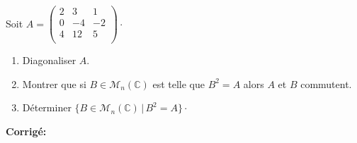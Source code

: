 \documentclass[a4paper,twoside,french,10pt]{VcCours}
\newcommand{\corr}{\textbf{Corrigé:}}
\begin{document}
\begin{Exercice}{} Soit $A= \begin{pmatrix}
2 & 3 & 1 \\
0 & -4 & -2 \\
4 & 12 & 5 \\
\end{pmatrix}\cdot$

\begin{enumerate}
\item Diagonaliser $A$.
\item Montrer que si $B \in \mathcal{M}_n(\mathbb{C})$ est telle que $B^2=A$ alors $A$ et $B$ commutent.
\item Déterminer $\lbrace B \in \mathcal{M}_n(\mathbb{C}) \, \vert \, B^2=A \rbrace \cdot$
\end{enumerate}
\end{Exercice}

\corr 
\end{document}
